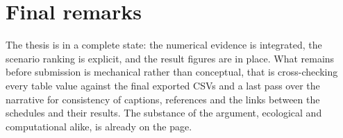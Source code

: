 \section{Final remarks}

The thesis is in a complete state: the numerical evidence is integrated, the scenario ranking is explicit, and the result figures are in place. What remains before submission is mechanical rather than conceptual, that is cross-checking every table value against the final exported CSVs and a last pass over the narrative for consistency of captions, references and the links between the schedules and their results. The substance of the argument, ecological and computational alike, is already on the page.

